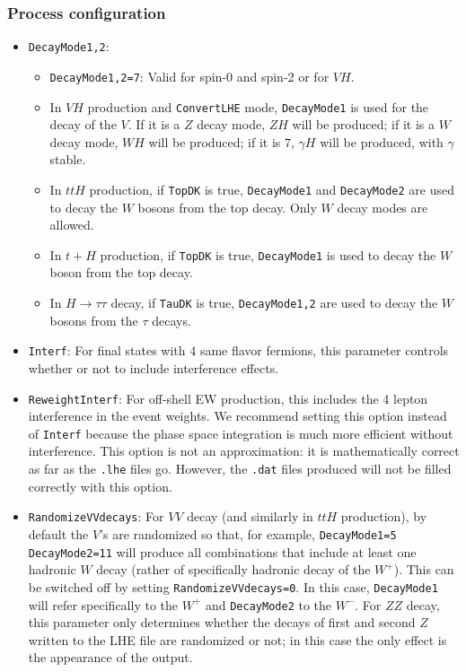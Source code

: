 \documentclass[aps,superscriptaddress,nofootinbib]{revtex4}
\begin{document}
\subsubsection{Process configuration}
\begin{itemize}
\item \verb|DecayMode1,2|:
\begin{itemize}
\item \verb|DecayMode1,2=7|: Valid for spin-0 and spin-2 or for $VH$.
\item In $VH$ production and \verb|ConvertLHE| mode, \verb|DecayMode1| is used for the decay of the $V$.  If it is a $Z$ decay mode, $ZH$ will be produced; if it is a $W$ decay mode, $WH$ will be produced; if it is $7$, $\gamma H$ will be produced, with $\gamma$ stable.
\item In $ttH$ production, if \verb|TopDK| is true, \verb|DecayMode1| and \verb|DecayMode2| are used to decay the $W$ bosons from the top decay.  Only $W$ decay modes are allowed.
\item In $t+H$ production, if \verb|TopDK| is true, \verb|DecayMode1| is used to decay the $W$ boson from the top decay.
\item In $H\to \tau\tau$ decay, if \verb|TauDK| is true, \verb|DecayMode1,2| are used to decay the $W$ bosons from the $\tau$ decays.
\end{itemize}
\item \verb|Interf|: For final states with 4 same flavor fermions, this parameter controls whether or not to include interference effects.
\item \verb|ReweightInterf|: For off-shell EW production, this includes the 4 lepton interference in the event weights.  We recommend setting this option instead of \texttt{Interf} because the phase space integration is much more efficient without interference.  This option is not an approximation: it is mathematically correct as far as the \texttt{.lhe} files go.  However, the \texttt{.dat} files produced will not be filled correctly with this option.
\item \verb|RandomizeVVdecays|: For $VV$ decay (and similarly in $ttH$ production), by default the $V$'s are randomized so that, for example, \verb|DecayMode1=5 DecayMode2=11| will produce all combinations that include at least one hadronic $W$ decay (rather of specifically hadronic decay of the $W^+$).  This can be switched off by setting \verb|RandomizeVVdecays=0|.  In this case, \verb|DecayMode1| will refer specifically to the $W^+$ and \verb|DecayMode2| to the $W^-$.  For $ZZ$ decay, this parameter only determines whether the decays of first and second $Z$ written to the LHE file are randomized or not; in this case the only effect is the appearance of the output.

\end{itemize}
\end{document}
